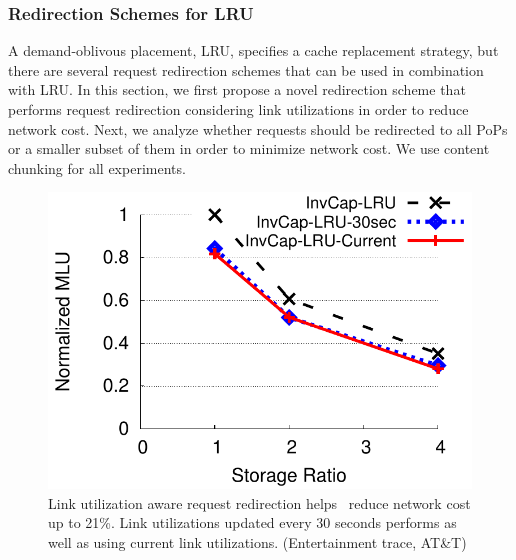 

\subsubsection{Redirection Schemes for LRU}

\label{sec:redirectlru}
A demand-oblivous placement, LRU, specifies a cache replacement strategy, but there are several request redirection schemes that can be used in combination with LRU. In this section, we first propose a novel redirection scheme  that performs request redirection considering link utilizations in order to reduce network cost.  Next, we analyze whether requests should be redirected to all PoPs or a smaller subset of them in order to minimize network cost. We use content chunking for all experiments.


\begin{figure}[t]
\begin{center}
\includegraphics[scale=0.6]{graphSet1/lrusnmp/ATTVideos.pdf}
\end{center}
\caption{Link utilization aware request redirection helps \invlru\ reduce network cost up to 21\%. Link utilizations updated every 30 seconds performs as well as using current link utilizations. (Entertainment trace, AT\&T)}
\label{fig:lrusnmp}
\end{figure}





